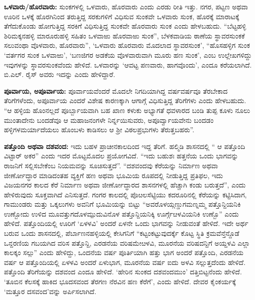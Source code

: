\textbf{ಒಳವಾರು/ಹೊರವಾರು: } ಸುಂಕಗಳಲ್ಲಿ ಒಳವಾರು, ಹೊರವಾರು ಎಂದು ಎರಡು ರೀತಿ ಇತ್ತು. ನಗರ, ಪಟ್ಟಣ ಅಥವಾ ಊರಿನ ಒಳಕ್ಕೆ ಹೊರಗಿನಿಂದ ತರುತ್ತಿದ್ದ ಸರಕುಗಳಿಗೆ ವಿಧಿಸುವ ಸುಂಕವೇ ಒಳವಾರು ಸುಂಕ, ಹೊರಕ್ಕೆ ಮಾರಾಟಕ್ಕೆ ತೆಗೆದುಕೊಂಡು ಹೋಗುತ್ತಿದ್ದ ಸರಕಿಗೆ ವಿಧಿಸುತ್ತಿದ್ದ ಸುಂಕವೇ ಹೊರವಾರು ಸುಂಕ ಎಂದು ಹೇಳಬಹುದು. “ಬೆಟ್ಟಹಳ್ಳಿ ಶಿರಿಮಕ್ಕನಹಳ್ಳಿ ಮಾರೂರುಹಳ್ಳಿ ಸಹಿತಂ ಒಳವಾಱು ಹೊರವಾಱು ಸುಂಕ”, ಬೆಳಕವಾಡಿಯ ಠಾಣೆಯ ಸ್ಥಾವರಸುಂಕಕೆ ಸಲುವಂಥಾ ವೊಳವಾರು, ಹೊರವಾರು”, ‘ಒಳವಾರು ಹೊರವಾರು ಮೊದಲಾದ ಸ್ಥಾವರಸುಂಕ’, “ಹೊಸಹಳ್ಳಿಗ ಸುಂಕ ‘ವರ್ತಗರ ಸುಂಕ ಒಳವಾಱು’, ‘ಬಣಜಿಗರ ಅಡಕೆಯ ವೊಳವಾರುವಾಗಿ ಮೂರು ಹಣ ಸುಂಕ’, ಎಂಬ ಉಲ್ಲೇಖಗಳಿದ್ದು ಇವುಗಳನ್ನು ಸ್ಥಾವರಸುಂಕವೆಂದು ಹೇಳಿದೆ. ಒಳವಾರನ್ನು ‘ಆವಟ್ಟ ಪಣವಾರು, ಹಾಗವೊಂದು’, ಎಂದೂ ಕರೆಯಲಾಗಿದೆ. ಬಿ.ಎಲ್​. ರೈಸ್​ ಅವರು ಇದನ್ನು  ಎಂದು ಹೇಳಿದ್ದಾರೆ.

\textbf{ಪೂರ್ವಾಯ, ಅಪೂರ್ವಾಯ: } ಪೂರ್ವಾಯವೆಂದರೆ ಮೊದಲೇ ನಿಗದಿಯಾಗಿದ್ದ ವರ್ಷವರ್ಷವೂ ತೆರಬೇಕಾದ ತೆರಿಗೆಗಳೆಂದು, ಅಪೂರ್ವಾಯ ಎಂದರೆ ವಿಶೇಷ ಕಾರಣಕ್ಕಾಗಿ ಆಗಾಗ್ಗೆ ವಿಧಿಸುತ್ತಿದ್ದ ತೆರಿಗೆಗಳು ಎಂದು ಹೇಳಬಹುದು. “ಆ ಹಳ್ಳಿಯ ಹೊಂನಲ್ಲದೆ ಪೂರ್ಬ್ಬಾಯವಾಗಿ ಬಹ ಖಾಣ ಕಳುಕು ಅಭ್ಯಾಗತೆ ಧವಳಾರದ ಬಂಡಿ ತುಪ್ಪ ಕೂಳು ನೂಲು ಮುಂತಾದೇನು ಬಂದಡೆವೂ ಆ ಮಹಾಜನಂಗಳೇ ನಿರ್ನ್ನಯಿಸುವರು, ಅಪೂರ್ವ್ವಾಯವೇನು ಬಂದಡಂ ಹಳ್ಳಿಗಳ\break ಮರ್ಯಾದೆಯಲು ಹೊಂಬಳು ಕಾಡಿಸಲು ಆ ಶ‍್ರೀ ವಿಠಲಪ್ರಭುಗಳು ತೆರುತ್ತಬಹರು”.

\textbf{ಪತ್ತೊಂದಿ ಅಥವಾ ದಶವಂದ:} ಇದು ಬಹಳ ಪ್ರಾಚೀನಕಾಲದಿಂದ ಇದ್ದ ತೆರಿಗೆ. ಹಲ್ಮಿಡಿ ಶಾಸನದಲ್ಲಿ “ ಆ ಪತ್ತೊಂದಿ ವಿಟ್ಟಾರ್​ ಅಕರ” ಎಂದು ಇದರ ಮೊಟ್ಟಮೊದಲ ಪ್ರಯೋಗವಿದೆ. “ಇದು ಬಹುಶಃ ಹತ್ತನೆಯ ಒಂದು ಭಾಗವನ್ನು ರಾಜನಿಗೆ ಸಲ್ಲಿಸಬೇಕೆಂಬ ನಿಯಮವನ್ನು ಸೂಚಿಸುತ್ತದೆ”. “ದಶವಂದವು ಕೆರೆಯನ್ನು ನಿರ್ಮಾಣ ಅಥವಾ ಜೀರ್ಣೋದ್ಧಾರ ಮಾಡಿದಂತಹ ವ್ಯಕ್ತಿಗೆ ಹಣ ಅಥವಾ ಭೂಮಿಯ ರೂಪದಲ್ಲಿ ನೀಡುತ್ತಿದ್ದ ಪ್ರತಿಫಲ, ಇದು ವಿಜಯನಗರ ಕಾಲದ ಕೆರೆ ನಿರ್ಮಾಣ ಅಥವಾ ಜೀರ್ಣೋದ್ಧಾರದ ಶಾಸನಗಳಲ್ಲಿ ಹೆಚ್ಚಾಗಿ ಕಂಡು ಬರುತ್ತದೆ”, ಎಂದು ಹೇಳಿರುವುದು ಸೂಕ್ತವಾಗಿದೆ ಎನಿಸುತ್ತದೆ. ಗಂಗರ ಕಾಲದಲ್ಲಿ ಪೊೞಲಸೆಟ್ಟಿಯು ಕದರೂರಿನಲ್ಲಿ ಕೆರೆಯನ್ನು ಕಟ್ಟಿಸಿದಾಗ, ಗಾಮುಂಡರು ಮತ್ತು ಒಕ್ಕಲುಗಳು ಅವನಿಗೆ ಭೂಮಿಯನ್ನು ಬಿಟ್ಟು “ಅವರೊಳಯ್ಗಣ್ಡುಗಮಣ್ನಮ್ಮ ಪತ್ತೊನ್ದಿಯನಿಕಿ ಉಣ್ಬೋದು ಉಳಿದ ಮೂವತ್ತುಗದೊಳಮ್ಪುದುವಿನೊಳ ಪತ್ತೊನ್ದಿಯನಿಕ್ಕಿ ಊರ್ಗ್ಗೆೞಳವಿಯನಿಕಿ ಉಣ್ಬೊ” ಎಂದು ಹೇಳಿದೆ. ಪತ್ತೊಂದಿಯಲ್ಲಿ ಊರಿಗೆ ‘ಏಳಳವಿ’ ಅಂದರೆ ಏಳನೇ ಒಂದು ಭಾಗವನ್ನು ನೀಡುವಂತೆ ಹೇಳಿದೆ. ಇದೇ ಅರ್ಥ ಬರುವ ಒಂದು ಶಾಸನದಲ್ಲಿ, ಪೆರ್ಬಾಣನಹಳ್ಳಿಯಲ್ಲಿ ಕೇಸಿಗನಿಗೆ “ಕಟ್ಟಂಕಟ್ಟುವುದರ್ಕ್ಕೆ ಕೊಟ್ಟ ಸ್ಥಿತಿ ಕ್ರಮವೆನ್ತೆನ್ದೊಡೆ ಒನ್ದರಣಿಯ ಗಬಯಗಿದ ವರಿಸ ಪತ್ತೊನ್ದಿ, ಎರಡನೆಯ ವರಿಷಮೇೞಳವಿ, ಮೂರನೆಯ ವರಿಷದನ್ದಿಗೆ ಅಯ್ದಳವಿ ಎಲ್ಲಾ ಕಾಲಕ್ಕಂ ಸಲ್ಗು” ಎಂದು ಹೇಳಿದ್ದು, ಒಂದನೆಯ ವರ್ಷ ಪೂರ್ತಿಯಾಗಿ ಹತ್ತು ಭಾಗ ಅಂದರೆ ಪತ್ತೊಂದಿ, ಎರಡನೆಯ ವರ್ಷ ಆ ಪತ್ತೊಂದಿಯಲ್ಲಿ ಏಳಳವಿ ಅಂದರೆ ಏಳುಭಾಗ, ಮೂರನೆಯ ವರ್ಷ ಐದು ಅಳವಿ ಸಲ್ಲುತ್ತದೆಂದು ಹೇಳಿದೆ. ಪತ್ತೊಂದಿ ತೆರಿಗೆಯನ್ನು ದಶವಂದ ಎಂದೂ ಹೇಳಿದೆ. ‘ಹೇರಿನ ಸುಂಕದ ದಶವಂದಮುಂ’ ದತ್ತಿಬಿಟ್ಟನೆಂದು ಹೇಳಿದೆ. ‘ತೂಬಿನ ಕೆಲಸಕ್ಕೆ ಹಾಕಿದ ಭೂದಸವಂದ ತೆರಗಣ ನೆರವಿನ ಹಣ ಕೆರೆಗೆ’, ಎಂದು ಹೇಳಿದೆ. ದೇವರ ಕೈಂಕರ್ಯಕ್ಕೆ ‘ಮತ್ತೂರ ದಸವಂದ’ವನ್ನು ಅರ್ಪಿಸಲಾಗಿದೆ.

